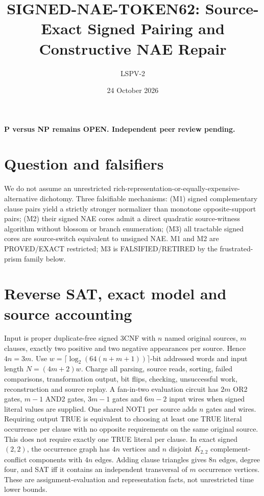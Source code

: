 \documentclass[11pt]{article}
\title{SIGNED-NAE-TOKEN62: Source-Exact Signed Pairing and Constructive NAE Repair}
\author{LSPV-2}
\date{24 October 2026}
\begin{document}
\maketitle
\begin{center}\textbf{P versus NP remains OPEN. Independent peer review pending.}\end{center}

\section{Question and falsifiers}
We do not assume an unrestricted rich-representation-or-equally-expensive-alternative dichotomy. Three falsifiable mechanisms: (M1) signed complementary clause pairs yield a strictly stronger normalizer than monotone opposite-support pairs; (M2) their signed NAE cores admit a direct quadratic source-witness algorithm without blossom or branch enumeration; (M3) all tractable signed cores are source-switch equivalent to unsigned NAE. M1 and M2 are PROVED/EXACT restricted; M3 is FALSIFIED/RETIRED by the frustrated-prism family below.

\section{Reverse SAT, exact model and source accounting}
Input is proper duplicate-free signed 3CNF with $n$ named original sources, $m$ clauses, exactly two positive and two negative appearances per source. Hence $4n=3m$. Use $w=\lceil\log_2(64(n+m+1))\rceil$-bit addressed words and input length $N=(4m+2)w$. Charge all parsing, source reads, sorting, failed comparisons, transformation output, bit flips, checking, unsuccessful work, reconstruction and source replay. A fan-in-two evaluation circuit has $2m$ OR2 gates, $m-1$ AND2 gates, $3m-1$ gates and $6m-2$ input wires when signed literal values are supplied. One shared NOT1 per source adds $n$ gates and wires. Requiring output TRUE is equivalent to choosing at least one TRUE literal occurrence per clause with no opposite requirements on the same original source. This does not require exactly one TRUE literal per clause. In exact signed $(2,2)$, the occurrence graph has $4n$ vertices and $n$ disjoint $K_{2,2}$ complement-conflict components with $4n$ edges. Adding clause triangles gives $8n$ edges, degree four, and SAT iff it contains an independent transversal of $m$ occurrence vertices. These are assignment-evaluation and representation facts, not unrestricted time lower bounds.
\end{document}

